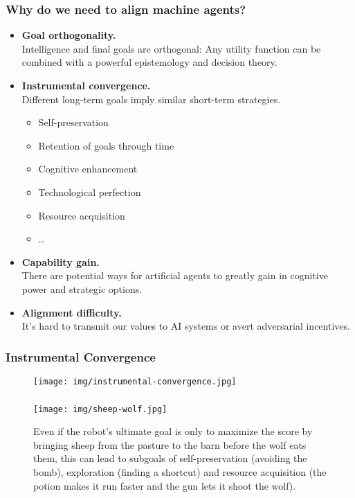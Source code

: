 \documentclass[UTF8,11pt,colorlinks,compress,openany]{beamer}%
\begin{document}
\begin{frame}\frametitle{Why do we need to align machine agents?}
\begin{itemize}
	\item \textbf{Goal orthogonality.}\\
	Intelligence and final goals are orthogonal: Any utility function can be combined with a powerful epistemology and decision theory.
	\item \textbf{Instrumental convergence.}\\
	Different long-term goals imply similar short-term strategies.
		\begin{itemize}
			\item Self-preservation
			\item Retention of goals through time
			\item Cognitive enhancement
			\item Technological perfection
			\item Resource acquisition
			\item \dots
		\end{itemize}
	\item \textbf{Capability gain.}\\
	There are potential ways for artificial agents to greatly gain in cognitive power and strategic options.
	\item \textbf{Alignment difficulty.}\\
	It's hard to transmit our values to AI systems or avert adversarial incentives.
\end{itemize}
\end{frame}

\begin{frame}\frametitle{Instrumental Convergence}
\begin{figure}[H]
\texttt{[image: img/instrumental-convergence.jpg]}		
\end{figure}	
\end{frame}

\begin{frame}\frametitle{}
\begin{figure}[H]
\texttt{[image: img/sheep-wolf.jpg]}\caption{Even if the robot's ultimate goal is only to maximize the score by bringing sheep from the pasture to the barn before the wolf eats them, this can lead to subgoals of self-preservation (avoiding the bomb), exploration (finding a shortcut) and resource acquisition (the potion makes it run faster and the gun lets it shoot the wolf).}
\end{figure}	
\end{frame}
\end{document}
